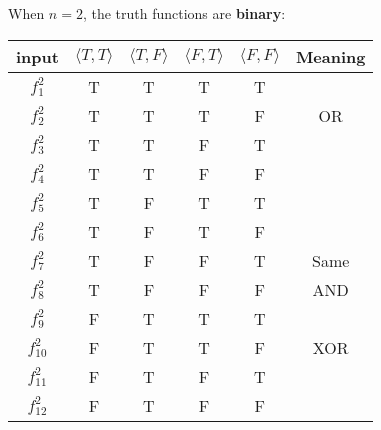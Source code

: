 \documentclass[12pt, letterpaper]{article}
\begin{document}
When $n = 2$, the truth functions are \textbf{binary}:

\begin{table}[H]
  \centering
  \begin{tabular}{|c|c|c|c|c|c|}
    \hline
    input      & $\langle T, T \rangle$ & $\langle T, F \rangle$ & $\langle F, T \rangle$ & $\langle F, F \rangle$ & Meaning \\ [1ex] \hline
    $f_1^2$    & T                      & T                      & T                      & T                      &         \\ [0.5ex] \hline
    $f_2^2$    & T                      & T                      & T                      & F                      & OR      \\ [0.5ex] \hline
    $f_3^2$    & T                      & T                      & F                      & T                      &         \\ [0.5ex] \hline
    $f_4^2$    & T                      & T                      & F                      & F                      &         \\ [0.5ex] \hline
    $f_5^2$    & T                      & F                      & T                      & T                      &         \\ [0.5ex] \hline
    $f_6^2$    & T                      & F                      & T                      & F                      &         \\ [0.5ex] \hline
    $f_7^2$    & T                      & F                      & F                      & T                      & Same    \\ [0.5ex] \hline
    $f_8^2$    & T                      & F                      & F                      & F                      & AND     \\ [0.5ex] \hline
    $f_9^2$    & F                      & T                      & T                      & T                      &         \\ [0.5ex] \hline
    $f_{10}^2$ & F                      & T                      & T                      & F                      & XOR     \\ [0.5ex] \hline
    $f_{11}^2$ & F                      & T                      & F                      & T                      &         \\ [0.5ex] \hline
    $f_{12}^2$ & F                      & T                      & F                      & F                      &         \\ [0.5ex] \hline

\end{tabular}
\end{table}
\end{document}

